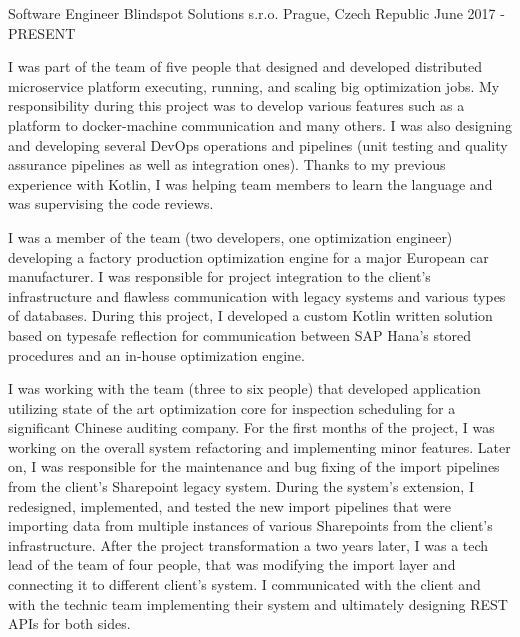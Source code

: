 
\begin{cventries}
		
	\cventry
	{Software Engineer}
	{Blindspot Solutions s.r.o.}
	{Prague, Czech Republic}
	{June 2017 - PRESENT}
	{
		\begin{cvitems}
			\setlength\itemsep{8pt}
			\item {
				I was part of the team of five people that designed and developed distributed microservice platform executing, running,
				and scaling big optimization jobs. 
			 	\newline
			 	My responsibility during this project was to develop various features such as a platform to docker-machine communication and many others.
				I was also designing and developing several DevOps operations and pipelines 
				(unit testing and quality assurance pipelines as well as integration ones).
				Thanks to my previous experience with Kotlin, I was helping team members to learn the language and was supervising the code reviews.
			}
			\item {
				I was a member of the team (two developers, one optimization engineer) developing a factory production optimization engine
				for a major European car manufacturer. 
				\newline
				I was responsible for project integration to the client's infrastructure and flawless communication with legacy systems 
				and various types of databases.
				During this project, I developed a custom Kotlin written solution based on typesafe reflection for communication
				between SAP Hana's stored procedures and an in-house optimization engine.
			}
			\item {
				I was working with the team (three to six people) that developed application utilizing state of the art optimization core 
				for inspection scheduling for a significant Chinese auditing company. 
				\newline
				For the first months of the project, I was working on the overall system refactoring and implementing minor features.
				Later on, I was responsible for the maintenance and bug fixing of the import pipelines from the client's Sharepoint legacy system.
				During the system's extension, I redesigned, implemented, and tested the new import pipelines that were importing data 
				from multiple instances of various Sharepoints from the client's infrastructure.
				\newline
				After the project transformation a two years later, I was a tech lead of the team of four people, 
				that was modifying the import layer and connecting it to different client's system. 
				I communicated with the client and with the technic team implementing their system and ultimately designing REST APIs for both sides.
			}
		\end{cvitems}
	}
	

\end{cventries}
